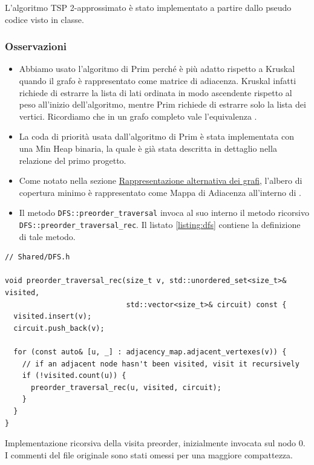 \noindent L'algoritmo TSP 2-approssimato è stato implementato a partire dallo pseudo codice visto in classe. \\

\subsubsection{Osservazioni}

\begin{itemize}
    \item Abbiamo usato l'algoritmo di Prim perché è più adatto rispetto a Kruskal quando il grafo è rappresentato come matrice di adiacenza. Kruskal infatti richiede di estrarre la lista di lati ordinata in modo ascendente rispetto al peso all'inizio dell'algoritmo, mentre Prim richiede di estrarre solo la lista dei vertici. Ricordiamo che in un grafo completo vale l'equivalenza \complexityCompleteGraph{}.

    \item La coda di priorità usata dall'algoritmo di Prim è stata implementata con una Min Heap binaria, la quale è già stata descritta in dettaglio nella relazione del primo progetto.
    
    \item Come notato nella sezione \hyperref[alternative-graph-representation]{Rappresentazione alternativa dei grafi}, l'albero di copertura minimo è rappresentato come Mappa di Adiacenza all'interno di .
    
    \item Il metodo \texttt{DFS::preorder_traversal} invoca al suo interno il metodo ricorsivo \\
    \texttt{DFS::preorder_traversal_rec}. Il listato \ref{listing:dfs} contiene la definizione di tale metodo.
\end{itemize}

\begin{listing}[!ht]
\begin{verbatim}
// Shared/DFS.h

void preorder_traversal_rec(size_t v, std::unordered_set<size_t>& visited,
                            std::vector<size_t>& circuit) const {
  visited.insert(v);
  circuit.push_back(v);

  for (const auto& [u, _] : adjacency_map.adjacent_vertexes(v)) {
    // if an adjacent node hasn't been visited, visit it recursively
    if (!visited.count(u)) {
      preorder_traversal_rec(u, visited, circuit);
    }
  }
}
\end{verbatim}
\caption{Implementazione ricorsiva della visita preorder, inizialmente invocata sul nodo $0$. I commenti del file originale sono stati omessi per una maggiore compattezza.}
\label{listing:dfs}
\end{listing}

